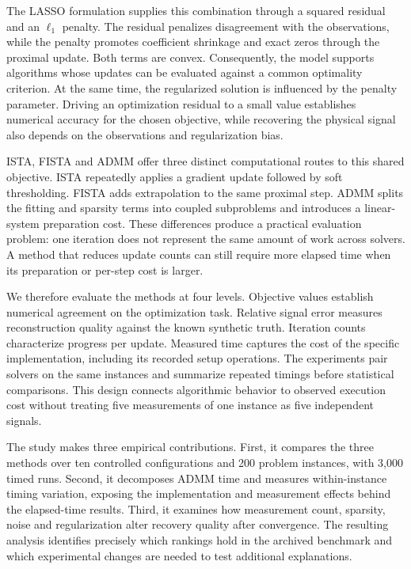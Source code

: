 \documentclass{article}
\begin{document}
The LASSO formulation supplies this combination through a squared residual and an $\ell_1$ penalty. The residual penalizes disagreement with the observations, while the penalty promotes coefficient shrinkage and exact zeros through the proximal update. Both terms are convex. Consequently, the model supports algorithms whose updates can be evaluated against a common optimality criterion. At the same time, the regularized solution is influenced by the penalty parameter. Driving an optimization residual to a small value establishes numerical accuracy for the chosen objective, while recovering the physical signal also depends on the observations and regularization bias.

ISTA, FISTA and ADMM offer three distinct computational routes to this shared objective. ISTA repeatedly applies a gradient update followed by soft thresholding. FISTA adds extrapolation to the same proximal step. ADMM splits the fitting and sparsity terms into coupled subproblems and introduces a linear-system preparation cost. These differences produce a practical evaluation problem: one iteration does not represent the same amount of work across solvers. A method that reduces update counts can still require more elapsed time when its preparation or per-step cost is larger.

We therefore evaluate the methods at four levels. Objective values establish numerical agreement on the optimization task. Relative signal error measures reconstruction quality against the known synthetic truth. Iteration counts characterize progress per update. Measured time captures the cost of the specific implementation, including its recorded setup operations. The experiments pair solvers on the same instances and summarize repeated timings before statistical comparisons. This design connects algorithmic behavior to observed execution cost without treating five measurements of one instance as five independent signals.

The study makes three empirical contributions. First, it compares the three methods over ten controlled configurations and 200 problem instances, with 3,000 timed runs. Second, it decomposes ADMM time and measures within-instance timing variation, exposing the implementation and measurement effects behind the elapsed-time results. Third, it examines how measurement count, sparsity, noise and regularization alter recovery quality after convergence. The resulting analysis identifies precisely which rankings hold in the archived benchmark and which experimental changes are needed to test additional explanations.
\end{document}
